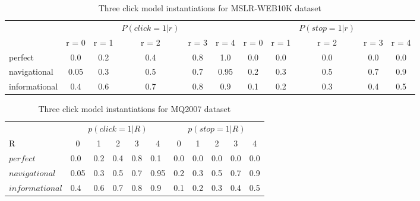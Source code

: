 \begin{table}
	\caption{Three click model instantiations for MSLR-WEB10K dataset}
	\label{table-cm-MSLR-WEB10K}
	\centering
	\begin{tabular}{l c c c c c c c c c c}
		\hline
		&&&$P(click = 1 | r)$ &&&&& $P(stop = 1 | r)$  && \\
		& r = 0&  r = 1  & r = 2 & r = 3 & r = 4 & r = 0&  r = 1  & r = 2 & r = 3 & r = 4\\
		\midrule
		perfect  &   0.0  &    0.2  &   0.4  & 0.8 & 1.0 & 0.0 & 0.0 & 0.0 & 0.0 & 0.0 \\
		navigational  &  0.05  &   0.3  &    0.5  & 0.7 & 0.95 & 0.2  & 0.3  & 0.5  & 0.7 & 0.9  \\
		informational  &   0.4 &   0.6  &   0.7 & 0.8 & 0.9  & 0.1  & 0.2 & 0.3 & 0.4 & 0.5 \\
		\hline
	\end{tabular}
\end{table}


\newcommand{\tc}[1]{\multicolumn{1}{c}{#1}}
\setlength{\tabcolsep}{3mm}
\begin{table}[t!]
	\centering
	\caption[centre]{Three click model instantiations for MQ2007 dataset}\label{mq2007-CCM}
	\begin{tabularx}{\textwidth}{XXXXXXXXXXX}
		\toprule
		& \multicolumn{5}{c}{$p(click=1|R)$} & \multicolumn{5}{c}{$p(stop=1|R)$} \\
		\cmidrule(r){2-6}  \cmidrule(){7-11}
		R & \tc{0}& \tc{1} &\tc{2} & \tc{3}& \tc{4}&  \tc{0} & \tc{1} & \tc{2} & \tc{3} & \tc{4} \\
		\midrule
		$perfect$ & 0.0 & 0.2 & 0.4 & 0.8 & 0.1& 0.0 & 0.0 & 0.0 & 0.0 & 0.0\\
		$navigational$ & 0.05 & 0.3 & 0.5 & 0.7 & 0.95& 0.2 & 0.3 & 0.5 & 0.7 & 0.9\\
		$informational$ & 0.4 & 0.6 & 0.7 & 0.8 & 0.9& 0.1 & 0.2 & 0.3 & 0.4 & 0.5\\
		\bottomrule
	\end{tabularx}
	\vspace{-10pt}
\end{table}

